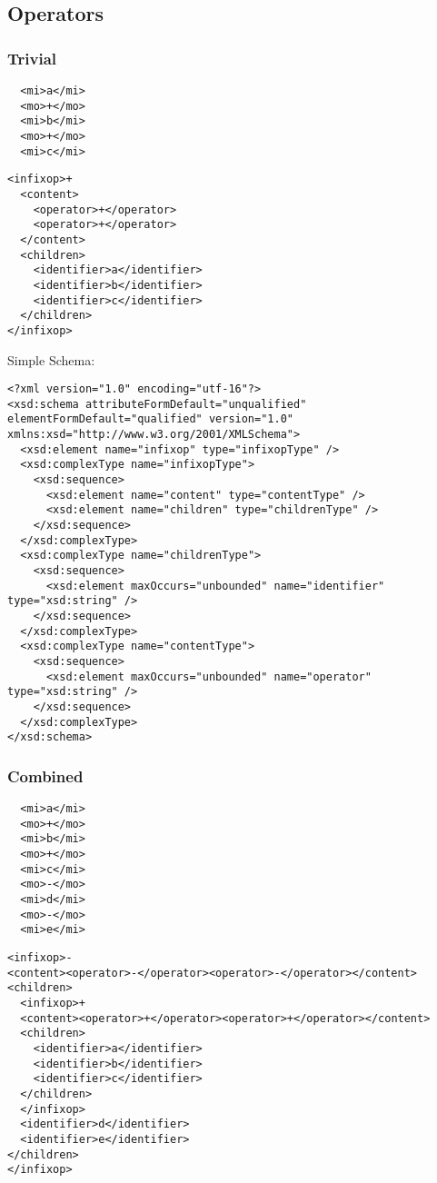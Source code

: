 \documentclass{article}
\begin{document}
\subsection{Operators}
\label{sec:operators}

\subsubsection{Trivial}
\label{sec:trivial-ops}


\begin{lstlisting}
  <mi>a</mi>
  <mo>+</mo>
  <mi>b</mi>
  <mo>+</mo>
  <mi>c</mi>
\end{lstlisting}
\begin{lstlisting}
<infixop>+
  <content>
    <operator>+</operator>
    <operator>+</operator>
  </content>
  <children>
    <identifier>a</identifier>
    <identifier>b</identifier>
    <identifier>c</identifier>
  </children>
</infixop>
\end{lstlisting}



Simple Schema:
\begin{lstlisting}
<?xml version="1.0" encoding="utf-16"?>
<xsd:schema attributeFormDefault="unqualified" elementFormDefault="qualified" version="1.0" xmlns:xsd="http://www.w3.org/2001/XMLSchema">
  <xsd:element name="infixop" type="infixopType" />
  <xsd:complexType name="infixopType">
    <xsd:sequence>
      <xsd:element name="content" type="contentType" />
      <xsd:element name="children" type="childrenType" />
    </xsd:sequence>
  </xsd:complexType>
  <xsd:complexType name="childrenType">
    <xsd:sequence>
      <xsd:element maxOccurs="unbounded" name="identifier" type="xsd:string" />
    </xsd:sequence>
  </xsd:complexType>
  <xsd:complexType name="contentType">
    <xsd:sequence>
      <xsd:element maxOccurs="unbounded" name="operator" type="xsd:string" />
    </xsd:sequence>
  </xsd:complexType>
</xsd:schema>
\end{lstlisting}

\subsubsection{Combined}
\label{sec:combined-ops}


\begin{lstlisting}
  <mi>a</mi>
  <mo>+</mo>
  <mi>b</mi>
  <mo>+</mo>
  <mi>c</mi>
  <mo>-</mo>
  <mi>d</mi>
  <mo>-</mo>
  <mi>e</mi>
\end{lstlisting}
\begin{lstlisting}
<infixop>-
<content><operator>-</operator><operator>-</operator></content>
<children>
  <infixop>+
  <content><operator>+</operator><operator>+</operator></content>
  <children>
    <identifier>a</identifier>
    <identifier>b</identifier>
    <identifier>c</identifier>
  </children>
  </infixop>
  <identifier>d</identifier>
  <identifier>e</identifier>
</children>
</infixop>
\end{lstlisting}
\end{document}
